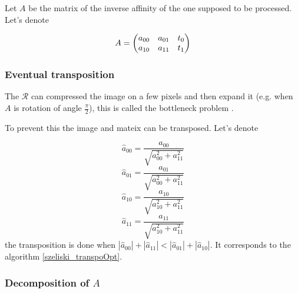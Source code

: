 	Let $A$ be the matrix of the inverse affinity of the one supposed to be processed. Let's denote

\[A = \begin{pmatrix} a_{00} & a_{01} & t_0\\ a_{10} & a_{11} & t_1 \end{pmatrix}\]

	
	
	
	\subsubsection{Eventual transposition}
		\label{szeliski_transpoOpt_section}
		
		The $\mathcal R$ can compressed the image on a few pixels and then expand it (e.g. when $A$ is rotation of angle $\frac{\pi}{2}$), this is called the bottleneck problem \cite{wolberg1990digital}.

		
		To prevent this the image and mateix can be transposed. Let's denote
		
		\[\hat a_{00} = \frac{a_{00}}{\sqrt{a_{00}^2+a_{11}^2}}\]
		\[\hat a_{01} = \frac{a_{01}}{\sqrt{a_{00}^2+a_{11}^2}}\]
		\[\hat a_{10} = \frac{a_{10}}{\sqrt{a_{10}^2+a_{11}^2}}\]
		\[\hat a_{11} = \frac{a_{11}}{\sqrt{a_{10}^2+a_{11}^2}}\]
		the transposition is done when $|\hat a_{00}|+|\hat a_{11}|<|\hat a_{01}|+|\hat a_{10}|$.
		It corresponds to the algorithm \ref{szeliski_transpoOpt}.
		
	\subsubsection{Decomposition of $A$}
		\label{szeliski_decompositionDeA_section}
		\label{szeliski_frequencesMax_section}
		
